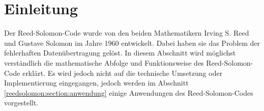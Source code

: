 %
%
%
\section{Einleitung
\label{reedsolomon:section:einleitung}}
Der Reed-Solomon-Code wurde von den beiden Mathematikern Irving S. Reed und Gustave Solomon im Jahre 1960 entwickelt.
Dabei haben sie das Problem der fehlerhaften Datenübertragung gelöst.
In diesem Abschnitt wird möglichst verständlich die mathematische Abfolge und  
Funktionsweise des Reed-Solomon-Code erklärt.
Es wird jedoch nicht auf die technische Umsetzung oder Implementierung eingegangen, jedoch werden im Abschnitt \ref{reedsolomon:section:anwendung} einige Anwendungen des Reed-Solomon-Codes vorgestellt.




